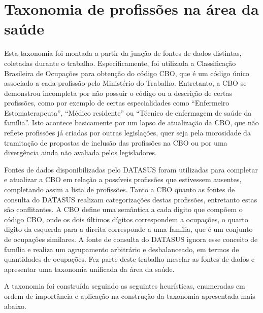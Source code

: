 \documentclass[a4paper,11pt]{article}
\begin{document}
\newpage



\appendix
\section{Taxonomia de profissões na área da saúde}
\label{app:taxonomiaProfissões}

Esta taxonomia foi montada a partir da junção de fontes de dados distintas, coletadas durante o trabalho.
Especificamente, foi utilizada a Classificação Brasileira de Ocupações para obtenção do código CBO, que é um código único associado a cada profissão pelo Ministério do Trabalho.
Entretanto, a CBO se demonstrou incompleta por não possuir o código ou a descrição de certas profissões, como por exemplo de certas especialidades como ``Enfermeiro Estomaterapeuta'', ``Médico residente'' ou ``Técnico de enfermagem de saúde da família''.
Isto acontece basicamente por um lapso de atualização da CBO, que não reflete profissões já criadas por outras legislações, quer seja pela morosidade da tramitação de propostas de inclusão das profissões na CBO ou por uma divergência ainda não avaliada pelos legisladores.

Fontes de dados disponibilizadas pelo DATASUS foram utilizadas para completar e atualizar a CBO em relação a possíveis profissões que estivessem ausentes, completando assim a lista de profissões.
Tanto a CBO quanto as fontes de consulta do DATASUS realizam categorizações destas profissões, entretanto estas são conflitantes.
A CBO define uma semântica a cada digito que compõem o código CBO, onde os dois últimos dígitos correspondem a ocupações, o quarto digito da esquerda para a direita corresponde a uma família, que é um conjunto de ocupações similares.
A fonte de consulta do DATASUS ignora esse conceito de família e realiza um agrupamento arbitrário e desbalanceado, em termos de quantidades de ocupações.
Fez parte deste trabalho mesclar as fontes de dados e apresentar uma taxonomia unificada da área da saúde.

A taxonomia foi construída seguindo as seguintes heurísticas, enumeradas em ordem de importância e aplicação na construção da taxonomia apresentada mais abaixo.
\end{document}
